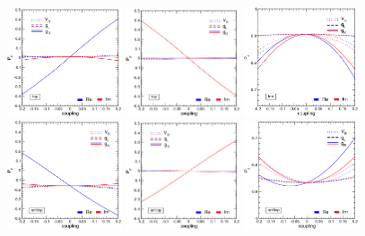 \begin{figure} 
\centering
  \includegraphics[width=0.3\textwidth]{./Figuras/AGUILARfig1a.png}
  \includegraphics[width=0.3\textwidth]{./Figuras/AGUILARfig1b.png}
  \includegraphics[width=0.3\textwidth]{./Figuras/AGUILARfig1c.png}
\hspace{0mm}
  \includegraphics[width=0.3\textwidth]{./Figuras/AGUILARfig1d.png}
  \includegraphics[width=0.3\textwidth]{./Figuras/AGUILARfig1e.png}
  \includegraphics[width=0.3\textwidth]{./Figuras/AGUILARfig1f.png}

\end{figure}
